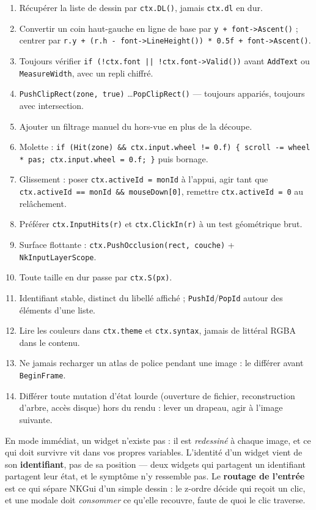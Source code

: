 \begin{enumerate}
  \item Récupérer la liste de dessin par \texttt{ctx.DL()}, jamais
        \texttt{ctx.dl} en dur.
  \item Convertir un coin haut-gauche en ligne de base par
        \texttt{y + font->Ascent()} ; centrer par
        \texttt{r.y + (r.h - font->LineHeight()) * 0.5f + font->Ascent()}.
  \item Toujours vérifier \texttt{if (!ctx.font || !ctx.font->Valid())} avant
        \texttt{AddText} ou \texttt{MeasureWidth}, avec un repli chiffré.
  \item \texttt{PushClipRect(zone, true)} \dots \texttt{PopClipRect()} —
        toujours appariés, toujours avec intersection.
  \item Ajouter un filtrage manuel du hors-vue en plus de la découpe.
  \item Molette : \texttt{if (Hit(zone) \&\& ctx.input.wheel != 0.f) \{ scroll -=
        wheel * pas; ctx.input.wheel = 0.f; \}} puis bornage.
  \item Glissement : poser \texttt{ctx.activeId = monId} à l'appui, agir tant que
        \texttt{ctx.activeId == monId \&\& mouseDown[0]}, remettre
        \texttt{ctx.activeId = 0} au relâchement.
  \item Préférer \texttt{ctx.InputHits(r)} et \texttt{ctx.ClickIn(r)} à un test
        géométrique brut.
  \item Surface flottante : \texttt{ctx.PushOcclusion(rect, couche)} +
        \texttt{NkInputLayerScope}.
  \item Toute taille en dur passe par \texttt{ctx.S(px)}.
  \item Identifiant stable, distinct du libellé affiché ;
        \texttt{PushId}/\texttt{PopId} autour des éléments d'une liste.
  \item Lire les couleurs dans \texttt{ctx.theme} et \texttt{ctx.syntax}, jamais
        de littéral RGBA dans le contenu.
  \item Ne jamais recharger un atlas de police pendant une image : le différer
        avant \texttt{BeginFrame}.
  \item Différer toute mutation d'état lourde (ouverture de fichier,
        reconstruction d'arbre, accès disque) hors du rendu : lever un drapeau,
        agir à l'image suivante.
\end{enumerate}

\begin{nkbilan}
En mode immédiat, un widget n'existe pas : il est \emph{redessiné} à chaque
image, et ce qui doit survivre vit dans vos propres variables. L'identité d'un
widget vient de son \textbf{identifiant}, pas de sa position --- deux widgets qui
partagent un identifiant partagent leur état, et le symptôme n'y ressemble pas.
Le \textbf{routage de l'entrée} est ce qui sépare NKGui d'un simple dessin : le
z-ordre décide qui reçoit un clic, et une modale doit \emph{consommer} ce
qu'elle recouvre, faute de quoi le clic traverse.
\end{nkbilan}

